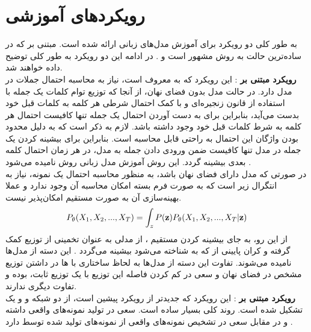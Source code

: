 \section{رویکردهای آموزشی} \label{chap1:sec:approaches}
به طور کلی دو رویکرد برای آموزش مدل‌های زبانی ارائه شده است. مبتنی بر \likelihood{} که در ساده‌ترین حالت به روش \teacherforcing{} مشهور است  و
.
در ادامه این دو رویکرد به طور کلی توضیح داده خواهند شد.
\\
{\bf رویکرد مبتنی بر \likelihood{}}:
این رویکرد که به
معروف است، نیاز به محاسبه احتمال جملات در مدل دارد. در حالت مدل بدون فضای نهان، از آنجا که توزیع توام کلمات یک جمله با استفاده از قانون زنجیره‌ای و با کمک احتمال شرطی هر کلمه به کلمات قبل خود بدست می‌آید، بنابراین برای به دست آوردن احتمال یک جمله تنها کافیست احتمال هر کلمه به شرط کلمات قبل خود وجود داشته باشد. لازم به ذکر است که به دلیل محدود بودن واژگان این احتمال به راحتی قابل محاسبه است. بنابراین برای بیشینه کردن \likelihood{} یک جمله در مدل تنها کافیست ضمن ورودی دادن جمله به مدل، در هر زمان احتمال کلمه بعدی بیشینه گردد. این روش آموزش مدل زبانی روش
نامیده می‌شود \cite{teacher_force}.
\\
در صورتی که مدل دارای فضای نهان باشد، به منظور محاسبه احتمال یک نمونه، نیاز به انتگرال زیر است که به صورت فرم بسته امکان محاسبه آن وجود ندارد و عملا بهینه‌سازی آن به صورت مستقیم امکان‌پذیر نیست.
\begin{align}
	P_\theta(X_1, X_2, ... , X_T) = \int_z P({\bf z})P_\theta(X_1, X_2, ... , X_T|{\bf z})
\end{align}
از این رو، به جای بیشینه کردن مستقیم \likelihood{}، از مدلی به عنوان تخمینی از توزیع
کمک گرفته و کران پایینی از \likelihood{} که به  شناخته می‌شود بیشینه می‌گردد \cite{vae}. این دسته از مدل‌ها
نامیده می‌شوند. تفاوت این دسته از مدل‌ها به لحاظ ساختاری با
ها
در داشتن توزیع مشخص در فضای نهان و سعی در کم کردن فاصله این توزیع با یک توزیع ثابت، بوده و تفاوت دیگری ندارند.
\\
{\bf رویکرد مبتنی بر \gan{}}:
این رویکرد که جدید‌تر از رویکرد پیشین است، از دو شبکه \generator{} و
و یک \minmaxgame{} تشکیل شده است. روند کلی بسیار ساده است. \generator{} سعی در تولید نمونه‌های واقعی داشته و در مقابل \discriminator{} سعی در تشخیص نمونه‌های واقعی از نمونه‌های تولید شده توسط \generator{} دارد \cite{gan}.
\\
